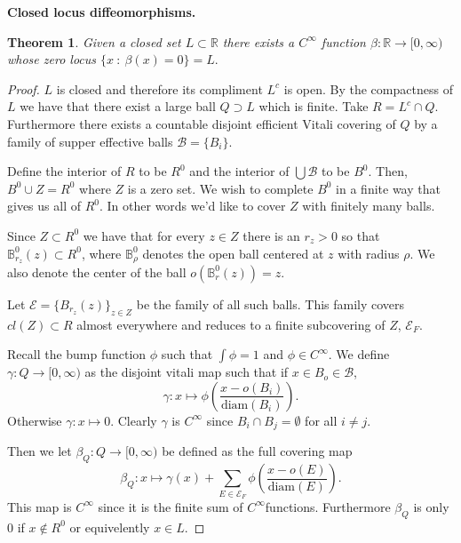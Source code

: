 \documentclass[letter]{article}
\newtheorem{theorem}{Theorem}
\newenvironment{menumerate}{%
  \edef\backupindent{\the\parindent}%
  \enumerate%
  \setlength{\parindent}{\backupindent}%
}{\endenumerate}
\begin{document}
\begin{menumerate}
	\setcounter{enumi}{75}
	\item \textbf{Closed locus diffeomorphisms.}
	\begin{theorem}
		Given a closed set $L \subset \mathbb{R}$ there exists a $C^\infty$
		function $\beta: \mathbb{R} \to [0, \infty)$ whose zero locus $\{x\ :\ \beta(x) = 0\} = L.$	
	\end{theorem}	
	\begin{proof}
		$L$ is closed and therefore its compliment $L^c$ is open. By the compactness of $L$ we have that there exist a large ball $Q \supset L$ which is finite. Take $R = L^c \cap Q.$ Furthermore there exists a countable disjoint efficient  Vitali covering of $Q$ by a family of supper effective balls $\mathcal{B} = \{B_i\}.$
		
		Define the interior of $R$ to be $R^{0}$ and the interior of $\bigcup \mathcal{B}$ to be $B^0$. Then, $B^0 \cup Z = R^0$ where $Z$ is a zero set. We wish to complete $B^0$ in a finite way that gives us all of $R^0.$ In other words we'd like to cover $Z$ with finitely many balls. 

		Since $Z \subset R^0$ we have that for every $z \in Z$ there is an $r_z >0$ so that $\mathbb{B}^0_{r_z}(z) \subset R^0$, where $\mathbb{B}^0_\rho$ denotes the open ball centered at $z$ with radius $\rho.$ We also denote the center of the ball $o(\mathbb{B}^0_r(z)) = z.$

		Let $\mathcal{E} = \{B_{r_z}(z)\}_{z \in Z}$ be the family of all such balls. This family covers $cl(Z) \subset R$ almost everywhere and reduces to a finite subcovering of $Z$, $\mathcal{E}_F$. 

		Recall the bump function $\phi$ such that $\int \phi = 1$ and $\phi \in C^{\infty}.$ We define $\gamma : Q \to [0, \infty)$ as the disjoint
		vitali map such that if $x \in B_o \in \mathcal{B}$,
		\begin{equation}
			\gamma: x \mapsto \phi\left(\frac{x - o(B_i)}{\text{diam}(B_i)}\right).
		\end{equation}
		Otherwise $\gamma : x \mapsto 0$. Clearly $\gamma$ is $C^\infty$ since
		$B_i \cap B_j = \emptyset$ for all $i \neq j.$
		

		Then we let $\beta_Q: Q \to [0,\infty)$ be defined as the full covering map
		\begin{equation}
			\beta_Q : x \mapsto \gamma(x) + \sum_{E \in \mathcal{E}_F} \phi\left(\frac{x - o(E)}{\text{diam}(E)}\right).
		\end{equation}
		This map is $C^\infty$ since it is the finite sum of $C^\infty$functions. Furthermore $\beta_Q$ is only $0$ if $x \notin R^0$ or equivelently $x \in L$. 


\end{proof}
\end{menumerate}
\end{document}
